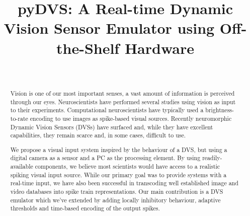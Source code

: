 \documentclass[conference]{IEEEtran}
\begin{document}
\title{pyDVS: A Real-time Dynamic Vision Sensor Emulator using Off-the-Shelf Hardware}
\author{

\\

}


\maketitle
\begin{abstract}
Vision is one of our most important senses, a vast amount of information is perceived through our eyes. Neuroscientists have performed several studies using vision as input to their experiments. Computational neuroscientists have typically used a brightness-to-rate encoding to use images as spike-based visual sources. Recently neuromorphic Dynamic Vision Sensors (DVSs) have surfaced and, while they have excellent capabilities, they remain scarce and, in some cases, difficult to use.

We propose a visual input system inspired by the behaviour of a DVS, but using a digital camera as a sensor and a PC as the processing element. By using readily-available components, we believe most scientists would have access to a realistic spiking visual input source. While our primary goal was to provide systems with a real-time input, we have also been successful in transcoding well established image and video databases into spike train representations. Our main contribution is a DVS emulator which we've extended by adding  locally inhibitory behaviour, adaptive thresholds and time-based encoding of the output spikes.

\end{abstract}
\IEEEpeerreviewmaketitle
\end{document}
